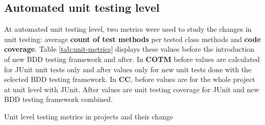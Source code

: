 \subsection{Automated unit testing level}
\label{subsub:unit-level-metrics}
At automated unit testing level, two metrics were used to study the changes in unit testing: average \textbf{count of test methods}
per tested class methods and \textbf{code coverage}. Table \ref{tab:unit-metrics} displays these values before the introduction
of new BDD testing framework and after. In \textbf{COTM} before values are calculated for JUnit unit tests only and after
values only for new unit tests done with the selected BDD testing framework. In \textbf{CC}, before values are for the
whole project at unit level with JUnit. After values are unit testing coverage for JUnit and new BDD testing framework
combined.

{\renewcommand{\arraystretch}{1.3}
\begin{table}[H]
        \caption {Unit level testing metrics in projects and their change} \label{tab:unit-metrics}
        \caption*{* = Value in parenthesis is without calculating data-driven tests sum}
\end{table}
}

